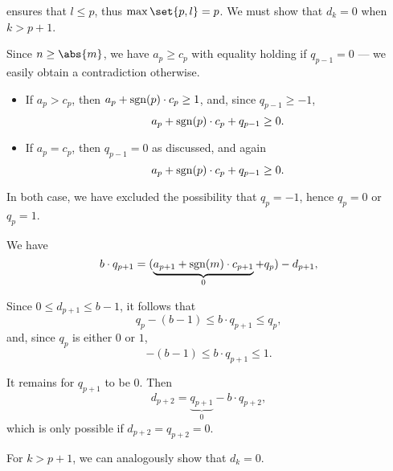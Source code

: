 \begin{defproof}
    ensures that \( l \leq p \), thus \( \max\set{ p, l } = p \). We must show that \( d_k = 0 \) when \( k > p + 1 \).

  Since \( n \geq \abs{m} \), we have \( a_p \geq c_p \) with equality holding if \( q_{p - 1} = 0 \) --- we easily obtain a contradiction otherwise.

  \begin{itemize}
    \item If \( a_p > c_p \), then \( a_p + \operatorname{sgn}(p) \cdot c_p \geq 1 \), and, since \( q_{p - 1} \geq -1 \),
    \begin{equation*}
      a_p + \operatorname{sgn}(p) \cdot c_p + q_{p - 1} \geq 0.
    \end{equation*}

    \item If \( a_p = c_p \), then \( q_{p - 1} = 0 \) as discussed, and again
    \begin{equation*}
      a_p + \operatorname{sgn}(p) \cdot c_p + q_{p - 1} \geq 0.
    \end{equation*}
  \end{itemize}

  In both case, we have excluded the possibility that \( q_p = -1 \), hence \( q_p = 0 \) or \( q_p = 1 \).

  We have
  \begin{equation*}
    b \cdot q_{p + 1} = (\underbrace{a_{p + 1} + \operatorname{sgn}(m) \cdot c_{p + 1}}_0 + q_p) - d_{p + 1},
  \end{equation*}

  Since \( 0 \leq d_{p + 1} \leq b - 1 \), it follows that
  \begin{equation*}
    q_p - (b - 1) \leq b \cdot q_{p + 1} \leq q_p,
  \end{equation*}
  and, since \( q_p \) is either \( 0 \) or \( 1 \),
  \begin{equation*}
    -(b - 1) \leq b \cdot q_{p + 1} \leq 1.
  \end{equation*}

  It remains for \( q_{p + 1} \) to be \( 0 \). Then
  \begin{equation*}
    d_{p + 2} = \underbrace{q_{p + 1}}_{0} - b \cdot q_{p + 2},
  \end{equation*}
  which is only possible if \( d_{p + 2} = q_{p + 2} = 0 \).

  For \( k > p + 1 \), we can analogously show that \( d_k = 0 \).


\end{defproof}
